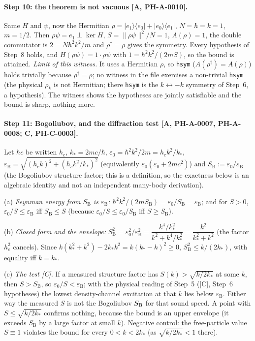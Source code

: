 \documentclass[11pt]{article}
\theoremstyle{remark}
\newcommand{\tier}[1]{\textsf{[#1]}}
\newcommand{\lean}[1]{\texttt{#1}}
\newcommand{\ks}{k_*}
\newcommand{\eps}{\varepsilon}
\newcommand{\hb}{\hbar}
\newcommand{\SB}{S_{\mathrm B}}
\newcommand{\eB}{\varepsilon_{\mathrm B}}
\begin{document}
\paragraph{Step 10: the theorem is not vacuous \tier{A, PH-A-0010}.} Same $H$ and $\psi$, now the Hermitian $\rho=|e_1\rangle\langle e_0|+|e_0\rangle\langle e_1|$,
$N=\hb=k=1$, $m=1/2$. Then $\rho\psi=e_1\perp\ker H$, $S=\|\rho\psi\|^2/N=1$, $A(\rho)=1$, the double commutator is $2=N\hb^2k^2/m$ and $\rho^\dagger=\rho$ gives the symmetry.
Every hypothesis of Step~8 holds, and $H(\rho\psi)=1\cdot\rho\psi$ with $1=\hb^2k^2/(2mS)$, so the bound is attained.
\emph{Limit of this witness.} It uses a Hermitian $\rho$, so \lean{hsym} ($A(\rho^\dagger)=A(\rho)$) holds trivially because $\rho^\dagger=\rho$; no witness in the file exercises a non-trivial \lean{hsym}
(the physical $\rho_k$ is not Hermitian; there \lean{hsym} is the $k\leftrightarrow-k$ symmetry of Step~6, a hypothesis). The witness shows the hypotheses are jointly satisfiable and the bound is sharp, nothing more.


\paragraph{Step 11: Bogoliubov, and the diffraction test \tier{A, PH-A-0007, PH-A-0008; C, PH-C-0003}.} Let $\hb c$ be written $h_c$, $\ks=2mc/\hb$, $\eps_0=\hb^2k^2/2m=h_ck^2/\ks$,
$\eB=\sqrt{(h_ck)^2+(h_ck^2/\ks)^2}$ (equivalently $\eps_0(\eps_0+2mc^2)$) and $\SB:=\eps_0/\eB$ (the Bogoliubov structure factor; this is a
definition, so the exactness below is an algebraic identity and not an independent many-body derivation).

(a) \emph{Feynman energy from $\SB$ is $\eB$:} $\hb^2k^2/(2m\SB)=\eps_0/\SB=\eB$; and for $S>0$, $\eps_0/S\le\eB$ iff $\SB\le S$ (because $\eps_0/S\le\eps_0/\SB$ iff $S\ge\SB$).

(b) \emph{Closed form and the envelope:} $\SB^2=\eps_0^2/\eB^2=\dfrac{k^4/\ks^2}{k^2+k^4/\ks^2}=\dfrac{k^2}{\ks^2+k^2}$ (the factor $h_c^2$ cancels). Since $k(\ks^2+k^2)-2\ks k^2=k(\ks-k)^2\ge0$,
$\SB^2\le k/(2\ks)$, with equality iff $k=\ks$.

(c) \emph{The test \tier{C}.} If a measured structure factor has $S(k)>\sqrt{k/2\ks}$ at some $k$, then $S>\SB$, so $\eps_0/S<\eB$; with the physical reading of Step~5
(\tier{C}, Step~6 hypotheses) the lowest density-channel excitation at that $k$ lies below $\eB$. Either way the measured $S$ is not the Bogoliubov
$S_{\rm B}$ for that sound speed. A point with $S\le\sqrt{k/2\ks}$ confirms nothing, because the bound is an upper envelope (it exceeds $\SB$ by a large factor at small $k$).
Negative control: the free-particle value $S\equiv1$ violates the bound for every $0<k<2\ks$ (as $\sqrt{k/2\ks}<1$ there).
\end{document}
